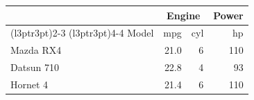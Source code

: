 \begin{table}
\centering
\begin{tabular}{lrrr}
\toprule
\multicolumn{1}{c}{ } & \multicolumn{2}{c}{Engine} & \multicolumn{1}{c}{Power} \\
\cmidrule(l{3pt}r{3pt}){2-3} \cmidrule(l{3pt}r{3pt}){4-4}
Model & mpg & cyl & hp\\
\midrule
Mazda RX4 & 21.0 & 6 & 110\\
Datsun 710 & 22.8 & 4 & 93\\
Hornet 4 & 21.4 & 6 & 110\\
\bottomrule
\end{tabular}
\end{table}
